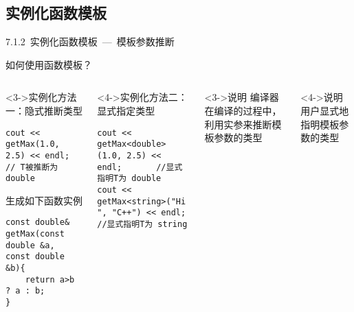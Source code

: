 \subsection{实例化函数模板}

\begin{frame}[fragile]{7.1.2~实例化函数模板\small{~---~模板参数推断}}

如何使用函数模板？ 

\vspace{-4mm}

\begin{columns}[t]

\begin{blueblock}<3->{实例化方法一：隐式推断类型}
\begin{lstlisting}
cout << getMax(1.0, 2.5) << endl; // T被推断为double
\end{lstlisting}
生成如下函数实例
\begin{lstlisting}
const double& getMax(const double &a, const double &b){
    return a>b ? a : b;
}
\end{lstlisting}

\end{blueblock}
\begin{blueblock}<4->{实例化方法二：显式指定类型}
\begin{lstlisting}
cout << getMax<double>(1.0, 2.5) << endl;       //显式指明T为 double
cout << getMax<string>("Hi ", "C++") << endl;   //显式指明T为 string
\end{lstlisting}
\end{blueblock}

\begin{yellowblock}<3->{说明}
编译器在\alert{编译}的过程中，利用实参来推断模板参数的类型
\end{yellowblock}
\vspace{1.8cm}
\begin{yellowblock}<4->{说明}
用户显式地指明模板参数的类型
\end{yellowblock}

\end{columns}

\end{frame}


